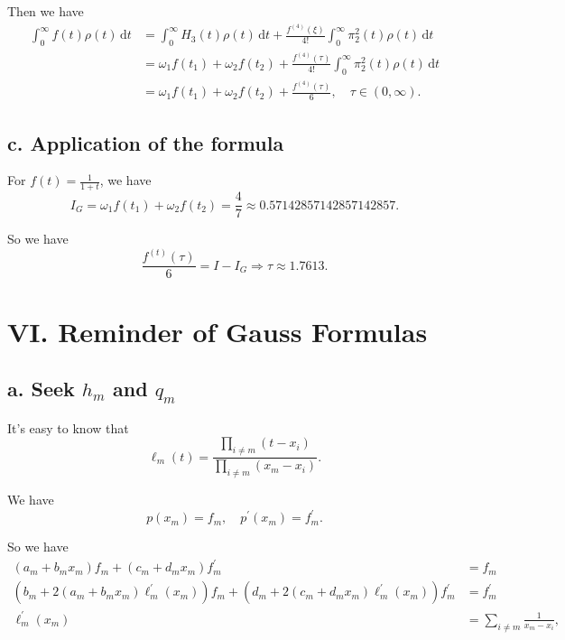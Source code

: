 \documentclass[a4paper]{article}
\begin{document}
Then we have 
\begin{equation}
  \begin{aligned}
    \int_{0}^{\infty} f(t) \rho(t) \,\mathrm{d}t &= \int_{0}^{\infty} H_3(t) \rho(t) \,\mathrm{d}t + \frac{f^{(4)} (\xi)}{4!} \int_{0}^{\infty} \pi_2^2(t) \rho(t) \,\mathrm{d}t \\
    &= \omega_1 f(t_1) + \omega_2 f(t_2) + \frac{f^{(4)} (\tau)}{4!} \int_{0}^{\infty} \pi_2^2(t) \rho(t) \,\mathrm{d}t \\
    &= \omega_1 f(t_1) + \omega_2 f(t_2) + \frac{f^{(4)} (\tau)}{6}, \quad \tau \in (0, \infty).
  \end{aligned}
\end{equation}

\subsection*{c. Application of the formula}

For $f(t) = \frac{1}{1+t}$, we have 
\begin{equation}
    I_G = \omega_1 f(t_1) + \omega_2 f(t_2) = \frac{4}{7} \approx 0.57142857142857142857. 
\end{equation}

So we have 
\begin{equation}
    \frac{f^{(t)} (\tau)}{6} = I - I_G \Rightarrow \tau \approx 1.7613. 
\end{equation}


\section*{VI. Reminder of Gauss Formulas}

\subsection*{a. Seek $h_m$ and $q_m$}
It's easy to know that 
\begin{equation}
    \ell_m(t) = \frac{\prod_{i \ne m} (t - x_i)}{\prod_{i \ne m} (x_m - x_i)}. 
\end{equation}

We have 
\begin{equation}
    p(x_m) = f_m, \quad p^{\prime} (x_m) = f^{\prime}_m. 
\end{equation}

So we have 
\begin{equation}
    \begin{aligned}
        (a_m + b_m x_m) f_m + (c_m +d_m x_m) f^{\prime}_m &= f_m \\
        (b_m + 2 (a_m + b_m x_m) \ell^{\prime}_m (x_m)) f_m + (d_m + 2 (c_m + d_m x_m) \ell^{\prime}_m (x_m)) f^{\prime}_m &= f^{\prime}_m \\
        \ell_m^{\prime} (x_m) &= \sum_{i \ne m} \frac{1}{x_m - x_i}, \\
    \end{aligned}
\end{equation}
\end{document}
